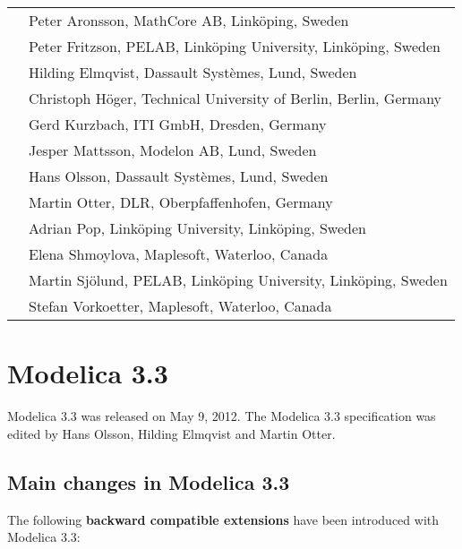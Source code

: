 \begin{longtable}{p{0.3cm}p{14cm}}
&Peter Aronsson, MathCore AB, Linköping, Sweden\\
&Peter Fritzson, PELAB, Linköping University, Linköping, Sweden\\
&Hilding Elmqvist, Dassault Systèmes, Lund, Sweden\\
&Christoph Höger, Technical University of Berlin, Berlin, Germany\\
&Gerd Kurzbach, ITI GmbH, Dresden, Germany\\
&Jesper Mattsson, Modelon AB, Lund, Sweden\\
&Hans Olsson, Dassault Systèmes, Lund, Sweden\\
&Martin Otter, DLR, Oberpfaffenhofen, Germany\\
&Adrian Pop, Linköping University, Linköping, Sweden\\
&Elena Shmoylova, Maplesoft, Waterloo, Canada\\
&Martin Sjölund, PELAB, Linköping University, Linköping, Sweden\\
&Stefan Vorkoetter, Maplesoft, Waterloo, Canada
\end{longtable}

\section{Modelica 3.3}

Modelica 3.3 was released on May 9, 2012. The Modelica 3.3 specification
was edited by Hans Olsson, Hilding Elmqvist and Martin Otter.

\subsection{Main changes in Modelica 3.3}

The following \textbf{backward compatible extensions} have been
introduced with Modelica 3.3:

